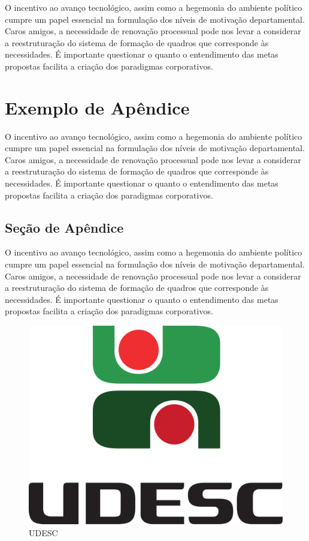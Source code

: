 \documentclass[a4paper,12pt]{udesc}
\begin{document}
          O incentivo ao avanço tecnológico, assim como a hegemonia do ambiente político cumpre um papel essencial na formulação dos níveis de motivação departamental. Caros amigos, a necessidade de renovação processual pode nos levar a considerar a reestruturação do sistema de formação de quadros que corresponde às necessidades. É importante questionar o quanto o entendimento das metas propostas facilita a criação dos paradigmas corporativos. 



\apendice

\chapter{Exemplo de Apêndice}

 O incentivo ao avanço tecnológico, assim como a hegemonia do ambiente político cumpre um papel essencial na formulação dos níveis de motivação departamental. Caros amigos, a necessidade de renovação processual pode nos levar a considerar a reestruturação do sistema de formação de quadros que corresponde às necessidades. É importante questionar o quanto o entendimento das metas propostas facilita a criação dos paradigmas corporativos. 
 
\section{Seção de Apêndice}

 O incentivo ao avanço tecnológico, assim como a hegemonia do ambiente político cumpre um papel essencial na formulação dos níveis de motivação departamental. Caros amigos, a necessidade de renovação processual pode nos levar a considerar a reestruturação do sistema de formação de quadros que corresponde às necessidades. É importante questionar o quanto o entendimento das metas propostas facilita a criação dos paradigmas corporativos. 
 
\begin{figure}[h]

\caption{UDESC}
\centering 
\includegraphics[scale=0.04]{fig/Marca_UDESC_vertical.pdf}

\end{figure}
\end{document}
